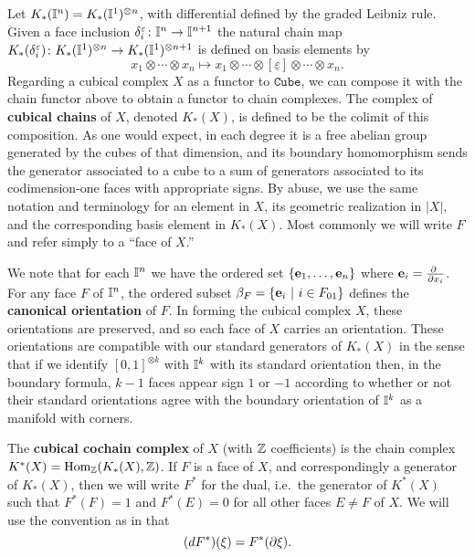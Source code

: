 Let $K_*(\mathbb{I}^n) = K_*(\mathbb{I}^1)^{ \otimes n}$, with differential defined by the graded Leibniz rule.
Given a face inclusion $\delta_i^{\varepsilon} \colon \mathbb{I}^n \to \mathbb{I}^{n+1}$ the natural chain map $K_*(\delta_i^{\varepsilon}) \colon K_*(\mathbb{I}^1)^{ \otimes n} \to K_*(\mathbb{I}^1)^{ \otimes n+1}$ is defined on basis elements by
\begin{equation*}
	x_1 \otimes \cdots \otimes x_n \mapsto
	x_1 \otimes \cdots \otimes [\underline{\varepsilon}] \otimes \cdots \otimes x_n.
\end{equation*}
Regarding a cubical complex $X$ as a functor to $\mathtt{Cube}$, we can compose it with the chain functor above to obtain a functor to chain complexes.
The complex of \textbf{cubical chains} of $X$, denoted $K_*(X)$, is defined to be the colimit of this composition.
As one would expect, in each degree it is a free abelian group generated by the cubes of that dimension, and its boundary homomorphism sends the
generator associated to a cube to a sum of generators associated to its codimension-one faces with appropriate signs.
By abuse, we use the same notation and terminology for an element in $X$, its geometric realization in $|X|$,
and the corresponding basis element in $K_*(X)$.
Most commonly we will write $F$ and refer simply to a ``face of $X$.''

We note that for each $\mathbb{I}^n$ we have the ordered set $\{\mathbf{e}_1, \dots, \mathbf{e}_n\}$ where $\mathbf{e}_i = \frac{\partial\ }{\partial x_i}$.
For any face $F$ of $\mathbb{I}^n$, the ordered subset $\beta_F = \{\mathbf{e}_i\ |\ i \in F_{01}\}$ defines the \textbf{canonical orientation} of $F$.
In forming the cubical complex $X$, these orientations are preserved, and so each face of $X$ carries an orientation.
These orientations are compatible with our standard generators of $K_*(X)$ in the sense that if we identify $[0,1]^{ \otimes k}$ with $\mathbb{I}^k$ with its standard orientation then, in the boundary formula, $k-1$ faces appear sign $1$ or $-1$ according to whether or not their standard orientations agree with the boundary orientation of $\mathbb{I}^k$ as a manifold with corners.

The \textbf{cubical cochain complex} of $X$ (with $\mathbb{Z}$ coefficients) is the chain complex $K^*(X) = \textup{Hom}_{\mathbb{Z}}(K_*(X), \mathbb{Z})$.
If $F$ is a face of $X$, and correspondingly a generator of $K_*(X)$, then we will write $F^*$ for the dual, i.e.\ the generator of $K^*(X)$ such that $F^*(F) = 1$ and $F^*(E) = 0$ for all other faces $E\neq F$ of $X$.
We will use the convention as in \cite{Mun84} that
$$(dF^*)(\xi) = F^*(\partial \xi).$$

